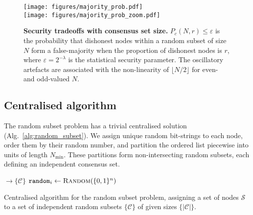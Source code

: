 \documentclass[twocolumn, aps, amsmath, amssymb, nofootinbib, superscriptaddress, longbibliography, floatfix, eqsecnum, rmp]{revtex4-2}
\let\oldalgorithmic\algorithmic
\let\endoldalgorithmic\endalgorithmic
\renewenvironment{algorithmic}
{\begin{adjustwidth}{-1em}{}\oldalgorithmic}
{\endoldalgorithmic\end{adjustwidth}}
\begin{document}

\begin{figure}
	\texttt{[image: figures/majority\_prob.pdf]}\\
	\texttt{[image: figures/majority\_prob\_zoom.pdf]}
	\caption{\textbf{Security tradeoffs with consensus set size.} $P_c(N,r)\leq\varepsilon$ is the probability that dishonest nodes within a random subset of size $N$ form a false-majority when the proportion of dishonest nodes is $r$, where $\varepsilon=2^{-\lambda}$ is the statistical security parameter. The oscillatory artefacts are associated with the non-linearity of \mbox{$\lfloor N/2\rfloor$} for even- and odd-valued $N$.} \label{fig:P_M}
\end{figure}

\subsection{Centralised algorithm}

The random subset problem has a trivial centralised solution (Alg.~\ref{alg:random_subset}). We assign unique random bit-strings to each node, order them by their random number, and partition the ordered list piecewise into units of length $N_\mathrm{min}$. These partitions form non-intersecting random subsets, each defining an independent consensus set.

\begin{algorithm}[H]
\begin{algorithmic}
 $\to \{\mathcal{C}\}$
		\State $\mathtt{random}_i \gets \textsc{Random}(\{0,1\}^n)$	\EndFor
	\State {}
\EndFunction
\end{algorithmic}
\caption{Centralised algorithm for the random subset problem, assigning a set of nodes $\mathcal{S}$ to a set of independent random subsets $\{\mathcal{C}\}$ of given sizes $\{|\mathcal{C}|\}$.} \label{alg:random_subset}
\end{algorithm}
\end{document}
